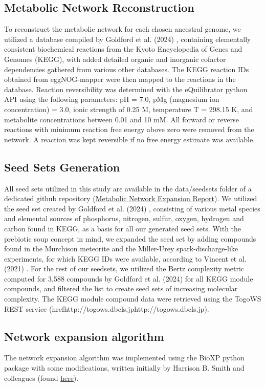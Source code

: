 \subsection*{Metabolic Network Reconstruction}


To reconstruct the metabolic network for each chosen ancestral genome, we utilized a database compiled by Goldford et al. (2024) \cite{goldford2024}, containing elementally consistent biochemical reactions from the Kyoto Encyclopedia of Genes and Genomes (KEGG), with added detailed organic and inorganic cofactor dependencies gathered from various other databases. The KEGG reaction IDs obtained from eggNOG-mapper were then mapped to the reactions in the database. Reaction reversibility was determined with the eQuilibrator python API \cite{beber2022} using the following parameters: pH = 7.0, pMg (magnesium ion concentration) = 3.0, ionic strength of 0.25 M, temperature T = 298.15 K, and metabolite concentrations between 0.01 and 10 mM. All forward or reverse reactions with minimum reaction free energy above zero were removed from the network. A reaction was kept reversible if no free energy estimate was available.

\subsection*{Seed Sets Generation}

All seed sets utilized in this study are available in the data/seedsets folder of a dedicated github repository (\href{https://github.com/astrademertzi/metnetexp_report}{Metabolic Network Expansion Report}). We utilized the seed set created by Goldford et al. (2024) \cite{goldford2024}, consisting of various metal species and elemental sources of phosphorus, nitrogen, sulfur, oxygen, hydrogen and carbon found in KEGG, as a basis for all our generated seed sets. With the prebiotic soup concept in mind, we expanded the seed set by adding compounds found in the Murchison meteorite and the Miller-Urey spark-discharge-like experiments, for which KEGG IDs were available, according to Vincent et al. (2021) \cite{vincent2021}. For the rest of our seedsets, we utilized the Bertz complexity metric computed for 3,588 compounds by Goldford et al. (2024) for all KEGG module compounds, and filtered the list to create seed sets of increasing molecular complexity. The KEGG module compound data were retrieved using the TogoWS REST service (href{http://togows.dbcls.jp}{http://togows.dbcls.jp}).


\subsection*{Network expansion algorithm} 

The network expansion algorithm was implemented using the BioXP python package with some modifications, written initially by Harrison B. Smith and colleagues (found \href{https://github.com/hbsmith/BioXP}{here}). 